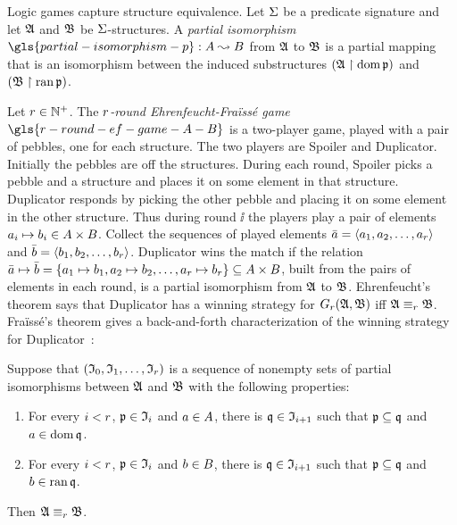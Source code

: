 Logic games capture structure equivalence.
Let $\mathrm{\Sigma}$ be a predicate signature and let $\mathfrak{A}$ and $\mathfrak{B}$ be
$\mathrm{\Sigma}$-structures.
A \emph{partial isomorphism} $\gls{partial-isomorphism-p} : \domA \pto \domB$
from $\mathfrak{A}$ to $\mathfrak{B}$ is a partial mapping that is an isomorphism between the 
induced substructures $(\mathfrak{A} \restriction \operatorname{dom} \mathfrak{p})$ and 
$(\mathfrak{B} \restriction \operatorname{ran} \mathfrak{p})$.

Let $r \in \mathbb{N}^{+}$.
The \emph{$r$-round Ehrenfeucht-Fra\"{i}ss\'{e} game}
$\gls{r-round-ef-game-A-B}$ is a two-player game, played with a pair of pebbles,
one for each structure. The two players are Spoiler and Duplicator.
Initially the pebbles are off the structures.
During each round, Spoiler picks a pebble and a structure
and places it on some element in that structure.
Duplicator responds by picking the other pebble and placing it on some
element in the other structure. Thus during round $\ii$ the players play a pair
of elements $a_{i} \mapsto b_{i} \in A \times B$. 
Collect the sequences of played elements $\bar{a} = \left\langle a_{1}, a_{2}, \dots,
a_{r} \right\rangle$ and $\bar{b} = \left\langle b_{1}, b_{2}, \dots, b_{r} \right\rangle$.
Duplicator wins the match if the
relation $\bar{a} \mapsto \bar{b} = \left\{a_{1} \mapsto b_{1}, a_{2} \mapsto
b_{2}, \dots, a_{r} \mapsto b_{r}\right\} \subseteq A \times B$, built from
the pairs of elements in each round, is a partial isomorphism from $\mathfrak{A}$ to
$\mathfrak{B}$.
Ehrenfeucht's theorem says that Duplicator has a winning strategy for
$G_{r}(\mathfrak{A},\mathfrak{B})$ iff $\mathfrak{A} \equiv_{r} \mathfrak{B}$.
Fra\"{i}ss\'{e}'s theorem gives a back-and-forth characterization of the winning
strategy for Duplicator~\cite[ch. 2]{ebbinghaus1999finite}:
\begin{theorem}\label{thm:game-ef}
Suppose that $(\mathfrak{I}_{0}, \mathfrak{I}_{1}, \dots, \mathfrak{I}_{r})$ is a sequence of nonempty
sets of partial isomorphisms between $\mathfrak{A}$ and $\mathfrak{B}$ with the following
properties:
\begin{enumerate}
  \item For every $i < r$, $\mathfrak{p} \in \mathfrak{I}_{i}$ and
  $a\in A$, there is $\mathfrak{q}\in\mathfrak{I}_{i+1}$ such that
  $\mathfrak{p}\subseteq\mathfrak{q}$ and $a\in\operatorname{dom}\mathfrak{q}$.
  \item For every $i < r$, $\mathfrak{p} \in \mathfrak{I}_{i}$ and
  $b\in B$, there is $\mathfrak{q}\in\mathfrak{I}_{i+1}$ such that
  $\mathfrak{p}\subseteq\mathfrak{q}$ and $b\in\operatorname{ran}\mathfrak{q}$.
\end{enumerate}
Then $\mathfrak{A} \equiv_{r} \mathfrak{B}$.
\end{theorem}
